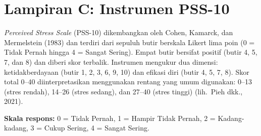 
\section*{Lampiran C: Instrumen PSS-10}

\textit{Perceived Stress Scale} (PSS-10) dikembangkan oleh Cohen, Kamarck, dan Mermelstein (1983) dan terdiri dari sepuluh butir berskala Likert lima poin (0 = Tidak Pernah hingga 4 = Sangat Sering). Empat butir bersifat positif (butir 4, 5, 7, dan 8) dan diberi skor terbalik. Instrumen mengukur dua dimensi: ketidakberdayaan (butir 1, 2, 3, 6, 9, 10) dan efikasi diri (butir 4, 5, 7, 8). Skor total 0--40 diinterpretasikan menggunakan rentang yang umum digunakan: 0--13 (stres rendah), 14--26 (stres sedang), dan 27--40 (stres tinggi) (lih.\ Pieh dkk., 2021).

\noindent\textbf{Skala respons:} 0 = Tidak Pernah, 1 = Hampir Tidak Pernah, 2 = Kadang-kadang, 3 = Cukup Sering, 4 = Sangat Sering.

